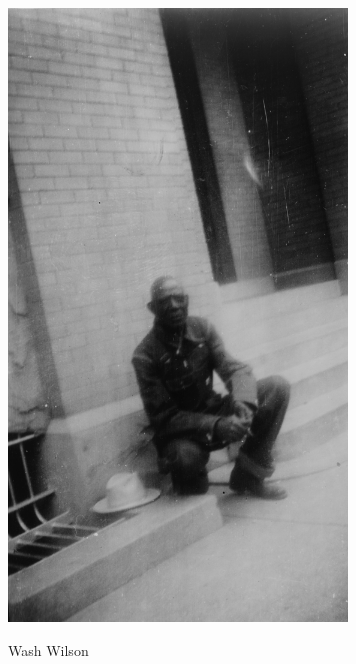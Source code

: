 \begin{figure}[H]
\centering
 \includegraphics[width=90mm]{./imgs/washwilson_recorte.jpg} \label{img17}
\caption{Wash Wilson}
\end{figure}





\pagebreak
\thispagestyle{empty}

